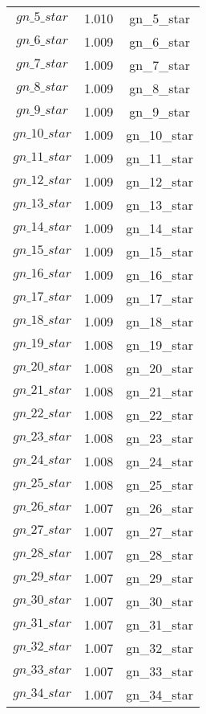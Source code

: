 \begin{center}
\begin{longtable}{ccc}
$gn\_5\_star$ 	 & 	 1.010 	 & 	 gn\_5\_star\\
$gn\_6\_star$ 	 & 	 1.009 	 & 	 gn\_6\_star\\
$gn\_7\_star$ 	 & 	 1.009 	 & 	 gn\_7\_star\\
$gn\_8\_star$ 	 & 	 1.009 	 & 	 gn\_8\_star\\
$gn\_9\_star$ 	 & 	 1.009 	 & 	 gn\_9\_star\\
$gn\_10\_star$ 	 & 	 1.009 	 & 	 gn\_10\_star\\
$gn\_11\_star$ 	 & 	 1.009 	 & 	 gn\_11\_star\\
$gn\_12\_star$ 	 & 	 1.009 	 & 	 gn\_12\_star\\
$gn\_13\_star$ 	 & 	 1.009 	 & 	 gn\_13\_star\\
$gn\_14\_star$ 	 & 	 1.009 	 & 	 gn\_14\_star\\
$gn\_15\_star$ 	 & 	 1.009 	 & 	 gn\_15\_star\\
$gn\_16\_star$ 	 & 	 1.009 	 & 	 gn\_16\_star\\
$gn\_17\_star$ 	 & 	 1.009 	 & 	 gn\_17\_star\\
$gn\_18\_star$ 	 & 	 1.009 	 & 	 gn\_18\_star\\
$gn\_19\_star$ 	 & 	 1.008 	 & 	 gn\_19\_star\\
$gn\_20\_star$ 	 & 	 1.008 	 & 	 gn\_20\_star\\
$gn\_21\_star$ 	 & 	 1.008 	 & 	 gn\_21\_star\\
$gn\_22\_star$ 	 & 	 1.008 	 & 	 gn\_22\_star\\
$gn\_23\_star$ 	 & 	 1.008 	 & 	 gn\_23\_star\\
$gn\_24\_star$ 	 & 	 1.008 	 & 	 gn\_24\_star\\
$gn\_25\_star$ 	 & 	 1.008 	 & 	 gn\_25\_star\\
$gn\_26\_star$ 	 & 	 1.007 	 & 	 gn\_26\_star\\
$gn\_27\_star$ 	 & 	 1.007 	 & 	 gn\_27\_star\\
$gn\_28\_star$ 	 & 	 1.007 	 & 	 gn\_28\_star\\
$gn\_29\_star$ 	 & 	 1.007 	 & 	 gn\_29\_star\\
$gn\_30\_star$ 	 & 	 1.007 	 & 	 gn\_30\_star\\
$gn\_31\_star$ 	 & 	 1.007 	 & 	 gn\_31\_star\\
$gn\_32\_star$ 	 & 	 1.007 	 & 	 gn\_32\_star\\
$gn\_33\_star$ 	 & 	 1.007 	 & 	 gn\_33\_star\\
$gn\_34\_star$ 	 & 	 1.007 	 & 	 gn\_34\_star\\

\end{longtable}
\end{center}
